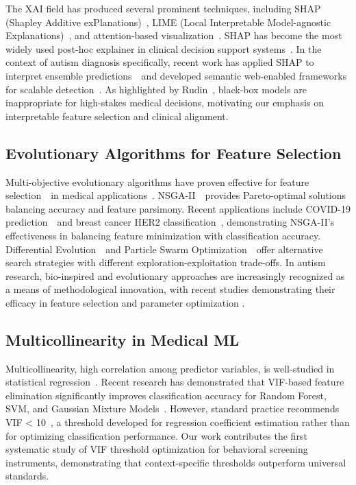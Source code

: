 The XAI field has produced several prominent techniques, including SHAP (Shapley Additive exPlanations)~\cite{ref17}, LIME (Local Interpretable Model-agnostic Explanations)~\cite{ref18}, and attention-based visualization~\cite{ref32}. SHAP has become the most widely used post-hoc explainer in clinical decision support systems~\cite{ref33}. In the context of autism diagnosis specifically, recent work has applied SHAP to interpret ensemble predictions~\cite{ref34}~and developed semantic web-enabled frameworks for scalable detection~\cite{ref20}. As highlighted by Rudin~\cite{ref16}, black-box models are inappropriate for high-stakes medical decisions, motivating our emphasis on interpretable feature selection and clinical alignment.

\subsection{Evolutionary Algorithms for Feature Selection}\label{evolutionary-algorithms-for-feature-selection}

Multi-objective evolutionary algorithms have proven effective for feature selection~\cite{ref35,ref36}~in medical applications~\cite{ref37,ref38}. NSGA-II~\cite{ref39}~provides Pareto-optimal solutions balancing accuracy and feature parsimony. Recent applications include COVID-19 prediction~\cite{ref37}~and breast cancer HER2 classification~\cite{ref38}, demonstrating NSGA-II's effectiveness in balancing feature minimization with classification accuracy. Differential Evolution~\cite{ref40}~and Particle Swarm Optimization~\cite{ref41}~offer alternative search strategies with different exploration-exploitation trade-offs. In autism research, bio-inspired and evolutionary approaches are increasingly recognized as a means of methodological innovation, with recent studies demonstrating their efficacy in feature selection and parameter optimization \cite{ref42,ref43,ref44}.

\subsection{Multicollinearity in Medical ML}\label{multicollinearity-in-medical-ml}

Multicollinearity, high correlation among predictor variables, is well-studied in statistical regression~\cite{ref14,ref45}. Recent research has demonstrated that VIF-based feature elimination significantly improves classification accuracy for Random Forest, SVM, and Gaussian Mixture Models~\cite{ref46}. However, standard practice recommends VIF \textless{} 10~\cite{ref15}, a threshold developed for regression coefficient estimation rather than for optimizing classification performance. Our work contributes the first systematic study of VIF threshold optimization for behavioral screening instruments, demonstrating that context-specific thresholds outperform universal standards.

